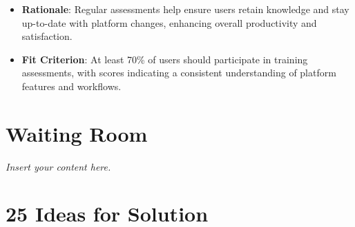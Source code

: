 \documentclass[12pt]{article}
\newcommand{\lips}{\textit{Insert your content here.}}
\begin{document}
\begin{enumerate}
\begin{itemize}[leftmargin=2cm]
            \item \textbf{Rationale}: Regular assessments help ensure users retain knowledge and stay up-to-date with platform changes, enhancing overall productivity and satisfaction.  
            \item \textbf{Fit Criterion}: At least 70\% of users should participate in training assessments, with scores indicating a consistent understanding of platform features and workflows.
        \end{itemize}
\end{enumerate}



\section{Waiting Room}
\lips

\section*{25 Ideas for Solution}
\end{document}
